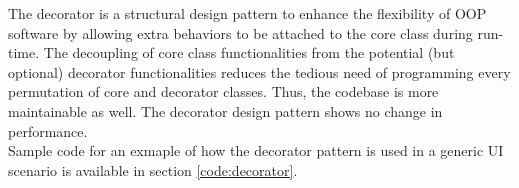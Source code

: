 \begin{multicols}{2}
The decorator is a structural design pattern to enhance the flexibility of OOP software by allowing extra behaviors to be attached to the core class during run-time. The decoupling of core class functionalities from the potential (but optional) decorator functionalities reduces the tedious need of programming every permutation of core and decorator classes. Thus, the codebase is more maintainable as well. The decorator design pattern shows no change in performance.\bs
\\
Sample code for an exmaple of how the decorator pattern is used in a generic UI scenario is available in section \ref{code:decorator}.




\end{multicols}
